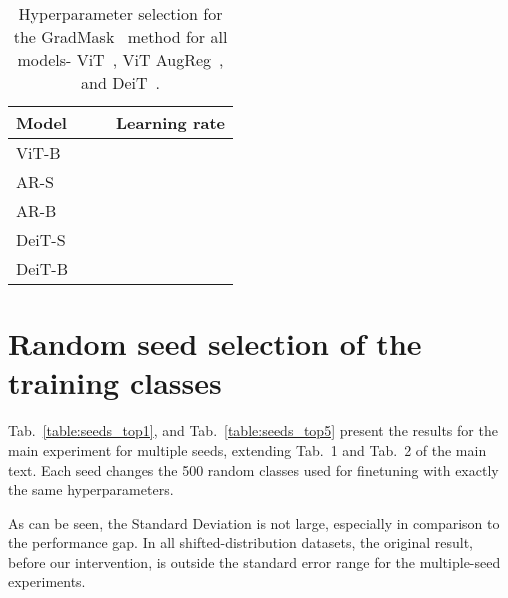 \documentclass{article}
\begin{document}
\begin{table}[]
\caption{
    Hyperparameter selection for the GradMask~\cite{Simpson2019GradMaskRO} method for all models- ViT~\cite{dosovitskiy2020image}, ViT AugReg~\cite{Steiner2021HowTT}, and DeiT~\cite{touvron2020training}.
    }
\begin{center}
\begin{tabular}{@{}l@{~~~}c@{~~~~}c@{~~~~}c@{}}
        \toprule
        Model&  &  & Learning rate \\
        \midrule
        ViT-B &  &  &  \\
        \midrule
        AR-S &  &  &  \\
        \midrule
        AR-B &  &  &    \\
        \midrule
        DeiT-S  &  &  &    \\
        \midrule
        DeiT-B  &  &  &     \\
        \bottomrule
    \end{tabular}
\smallskip
    \smallskip
    \label{table:hyperparam-GradMask}
    \end{center}
\end{table}

\clearpage


\section{Random seed selection of the training classes}
\label{sec:random_seeds}

Tab.~\ref{table:seeds_top1}, and Tab.~\ref{table:seeds_top5} present the results for the main experiment for multiple seeds, extending Tab.~1 and Tab.~2 of the main text. Each seed changes the 500 random classes used for finetuning with exactly the same hyperparameters.

As can be seen, the Standard Deviation is not large, especially in comparison to the performance gap. In all shifted-distribution datasets, the original result, before our intervention, is outside the standard error range for the multiple-seed experiments.
\end{document}
